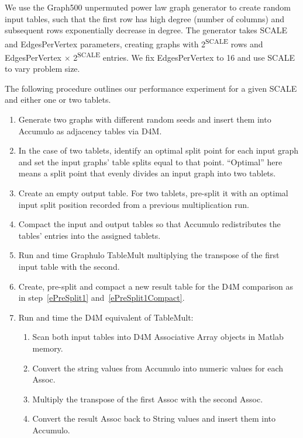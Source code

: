 We use the Graph500 unpermuted power law graph generator \cite{bader2006designing} 
to create random input tables,
such that the first row has high degree (number of columns) 
and subsequent rows exponentially decrease in degree.
The generator takes SCALE and EdgesPerVertex parameters, creating graphs with 2\textsuperscript{SCALE} 
rows and EdgesPerVertex $\times$ 2\textsuperscript{SCALE} entries.
We fix EdgesPerVertex to 16 and use SCALE to vary problem size. 

The following procedure outlines our performance experiment for a given SCALE and either one or two tablets.
\begin{enumerate}
\item Generate two graphs with different random seeds and insert them into Accumulo as adjacency tables via D4M.
\item In the case of two tablets, identify an optimal split point for each input graph
and set the input graphs' table splits equal to that point.
``Optimal'' here means a split point that evenly divides an input graph into two tablets.
\item \label{ePreSplit1} Create an empty output table. For two tablets, pre-split it with 
an optimal input split position recorded from a previous multiplication run.
\item \label{ePreSplit1Compact} Compact the input and output tables 
so that Accumulo redistributes the tables' entries into the assigned tablets.
\item Run and time Graphulo TableMult multiplying the transpose of the first input table with the second.
\item Create, pre-split and compact a new result table for the D4M comparison 
as in step~\ref{ePreSplit1} and~\ref{ePreSplit1Compact}.
\item Run and time the D4M equivalent of TableMult:
 \begin{enumerate}
 \item Scan both input tables into D4M Associative Array objects in Matlab memory.
 \item Convert the string values from Accumulo into numeric values for each Assoc.
 \item Multiply the transpose of the first Assoc with the second Assoc.
 \item Convert the result Assoc back to String values and insert them into Accumulo.
 \end{enumerate}
\end{enumerate}

